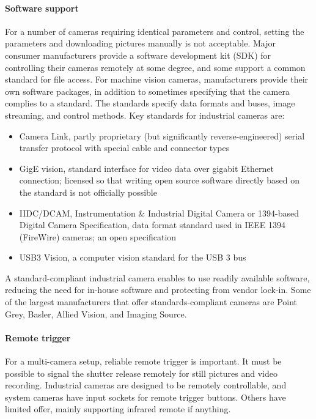 
\paragraph{Software support}
For a number of cameras requiring identical parameters and control, setting the parameters and downloading pictures manually is not acceptable.
Major consumer manufacturers provide a software development kit (SDK) for controlling their cameras remotely at some degree, and some support a common standard for file access.
For machine vision cameras, manufacturers provide their own software packages, in addition to sometimes specifying that the camera complies to a standard.
The standards specify data formats and buses, image streaming, and control methods.
Key standards for industrial cameras are: \cite{hornberg2007handbook,ni2013choosing}

\begin{itemize}
	\item Camera Link, partly proprietary (but significantly reverse-engineered) serial transfer protocol with special cable and connector types
	\item GigE vision, standard interface for video data over gigabit Ethernet connection; licensed so that writing open source software directly based on the standard is not officially possible
	\item IIDC/DCAM, Instrumentation \& Industrial Digital Camera or 1394-based Digital Camera Specification, data format standard used in IEEE 1394 (FireWire) cameras; an open specification
	\item USB3 Vision, a computer vision standard for the USB 3 bus
\end{itemize}

A standard-compliant industrial camera enables to use readily available software, reducing the need for in-house software and protecting from vendor lock-in.
Some of the largest manufacturers that offer standards-compliant cameras are Point Grey, Basler, Allied Vision, and Imaging Source.

\paragraph{Remote trigger}
For a multi-camera setup, reliable remote trigger is important.
It must be possible to signal the shutter release remotely for still pictures and video recording.
Industrial cameras are designed to be remotely controllable, and system cameras have input sockets for remote trigger buttons.
Others have limited offer, mainly supporting infrared remote if anything.

